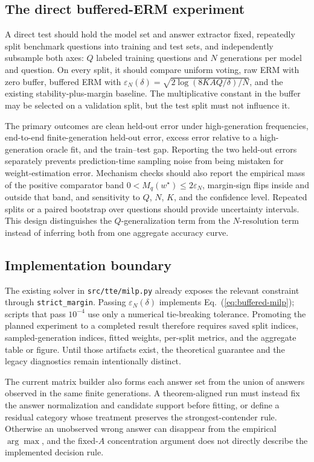 \subsection{The direct buffered-ERM experiment}
\label{sec:experiments-required}

A direct test should hold the model set and answer extractor fixed, repeatedly
split benchmark questions into training and test sets, and independently
subsample both axes: \(Q\) labeled training questions and \(N\) generations per
model and question.  On every split, it should compare uniform voting, raw ERM
with zero buffer, buffered ERM with
\(\varepsilon_N(\delta)=\sqrt{2\log(8KAQ/\delta)/N}\), and the existing
stability-plus-margin baseline.  The multiplicative constant in the buffer may
be selected on a validation split, but the test split must not influence it.

The primary outcomes are clean held-out error under high-generation
frequencies, end-to-end finite-generation held-out error, excess error relative
to a high-generation oracle fit, and the train--test gap.  Reporting the two
held-out errors separately prevents prediction-time sampling noise from being
mistaken for weight-estimation error.  Mechanism checks should also report the
empirical mass of the positive comparator band
\(0<M_q(w^\star)\le2\varepsilon_N\), margin-sign flips inside and outside that
band, and sensitivity to \(Q\), \(N\), \(K\), and the confidence level.  Repeated
splits or a paired bootstrap over questions should provide uncertainty
intervals.  This design distinguishes the \(Q\)-generalization term from the
\(N\)-resolution term instead of inferring both from one aggregate accuracy
curve.

\subsection{Implementation boundary}
\label{sec:experiments-implementation}

The existing solver in \texttt{src/tte/milp.py} already exposes the relevant
constraint through \texttt{strict\_margin}.  Passing
\(\varepsilon_N(\delta)\) implements Eq.~(\ref{eq:buffered-milp}); scripts that
pass \(10^{-4}\) use only a numerical tie-breaking tolerance.  Promoting the
planned experiment to a completed result therefore requires saved split
indices, sampled-generation indices, fitted weights, per-split metrics, and
the aggregate table or figure.  Until those artifacts exist, the theoretical
guarantee and the legacy diagnostics remain intentionally distinct.

The current matrix builder also forms each answer set from the union of answers
observed in the same finite generations.  A theorem-aligned run must instead
fix the answer normalization and candidate support before fitting, or define a
residual category whose treatment preserves the strongest-contender rule.
Otherwise an unobserved wrong answer can disappear from the empirical
\(\arg\max\), and the fixed-\(A\) concentration argument does not directly
describe the implemented decision rule.
